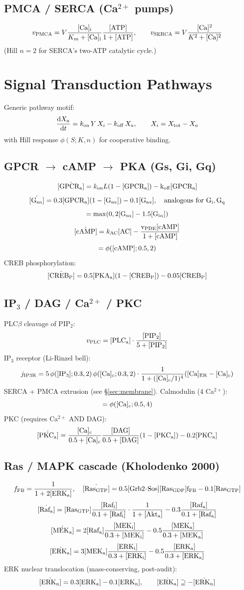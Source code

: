 \documentclass[11pt,a4paper]{article}
\newcommand{\eq}[1]{\begin{equation}#1\end{equation}}
\begin{document}
\subsection{PMCA / SERCA (Ca$^{2+}$ pumps)}
\eq{ v_{\rm PMCA} = V\frac{[\rm Ca]_i}{K_m+[\rm Ca]_i}\frac{[\rm ATP]}{1+[\rm ATP]},\qquad v_{\rm SERCA} = V\frac{[\rm Ca]^2}{K^2+[\rm Ca]^2} }
(Hill $n=2$ for SERCA's two-ATP catalytic cycle.)

\clearpage
\section{Signal Transduction Pathways}
\label{sec:signaling}
Generic pathway motif:
\eq{ \frac{\mathrm dX_a}{\mathrm dt}=k_{\rm on}\,Y\,X_i - k_{\rm off}\,X_a,\qquad X_i=X_{\rm tot}-X_a }
with Hill response $\phi(S;K,n)$ for cooperative binding.

\subsection{GPCR $\to$ cAMP $\to$ PKA (Gs, Gi, Gq)}
\eq{ \dot{[\rm GPCR_a]}=k_{\rm on}L(1-[\rm GPCR_a])-k_{\rm off}[\rm GPCR_a] }
\eq{ \dot{[\rm G_{s\alpha}]} = 0.3[\rm GPCR_a](1-[\rm G_{s\alpha}]) - 0.1[\rm G_{s\alpha}],\quad \text{analogous for }G_i,G_q }
\eq{ [\rm AC]=\max(0,2[\rm G_{s\alpha}]-1.5[\rm G_{i\alpha}]) }
\eq{ \dot{[\rm cAMP]} = k_{\rm AC}[\rm AC] - \frac{v_{\rm PDE}[\rm cAMP]}{1+[\rm cAMP]} }
\eq{ [\rm PKA_a] = \phi([\rm cAMP]; 0.5, 2) }
CREB phosphorylation:
\eq{ \dot{[\rm CREB_P]}=0.5[\rm PKA_a](1-[\rm CREB_P]) - 0.05[\rm CREB_P] }

\subsection{IP$_3$ / DAG / Ca$^{2+}$ / PKC}
PLC$\beta$ cleavage of PIP$_2$:
\eq{ v_{\rm PLC}=[\rm PLC_a]\cdot\frac{[\rm PIP_2]}{5+[\rm PIP_2]} }
IP$_3$ receptor (Li-Rinzel bell):
\eq{ j_{\rm IP3R}=5\,\phi([\rm IP_3];0.3,2)\,\phi([\rm Ca]_c;0.3,2)\cdot\frac{1}{1+([\rm Ca]_c/1)^4}([\rm Ca]_{\rm ER}-[\rm Ca]_c) }
SERCA + PMCA extrusion (see \S\ref{sec:membrane}).
Calmodulin (4 Ca$^{2+}$):
\eq{ [\rm CaM\cdot Ca_4]=\phi([\rm Ca]_c;0.5,4) }
PKC (requires Ca$^{2+}$ AND DAG):
\eq{ \dot{[\rm PKC_a]} = \frac{[\rm Ca]_c}{0.5+[\rm Ca]_c}\frac{[\rm DAG]}{0.5+[\rm DAG]}(1-[\rm PKC_a])-0.2[\rm PKC_a] }

\subsection{Ras / MAPK cascade (Kholodenko 2000)}
\eq{ f_{\rm FB}=\frac{1}{1+2[\rm ERK_a]},\quad \dot{[\rm Ras_{GTP}]}=0.5[\rm Grb2\!\cdot\!Sos][\rm Ras_{GDP}]f_{\rm FB} - 0.1[\rm Ras_{GTP}] }
\eq{ \dot{[\rm Raf_a]} = [\rm Ras_{GTP}]\frac{[\rm Raf_i]}{0.1+[\rm Raf_i]}\cdot\frac{1}{1+[\rm Akt_a]} - 0.3\frac{[\rm Raf_a]}{0.1+[\rm Raf_a]} }
\eq{ \dot{[\rm MEK_a]} = 2[\rm Raf_a]\frac{[\rm MEK_i]}{0.3+[\rm MEK_i]} - 0.5\frac{[\rm MEK_a]}{0.3+[\rm MEK_a]} }
\eq{ \dot{[\rm ERK_a]} = 3[\rm MEK_a]\frac{[\rm ERK_i]}{0.3+[\rm ERK_i]} - 0.5\frac{[\rm ERK_a]}{0.3+[\rm ERK_a]} }
ERK nuclear translocation (mass-conserving, post-audit):
\eq{ \dot{[\rm ERK_n]}=0.3[\rm ERK_a]-0.1[\rm ERK_n],\qquad \dot{[\rm ERK_a]}\supseteq-\dot{[\rm ERK_n]} }
\end{document}
